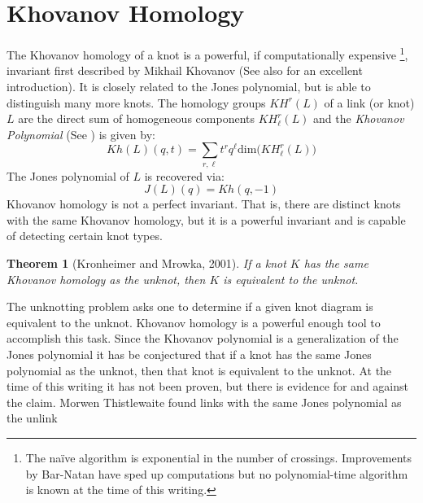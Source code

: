\documentclass{article}
\theoremstyle{plain}
\newtheorem{theorem}{Theorem}
\begin{document}
    \section{Khovanov Homology}
        The Khovanov homology of a knot is a powerful, if computationally
        expensive%
        \footnote{%
            The na\"{i}ve algorithm is exponential in the number of
            crossings. Improvements by Bar-Natan \cite{BarNatanFastKhoHo}
            have sped up computations but no polynomial-time algorithm is
            known at the time of this writing.
        },
        invariant first described by Mikhail Khovanov
        \cite{Khovanov1999CatJonesPoly} (See also \cite{barnatan2002khovanov}
        for an excellent introduction). It is closely related to the Jones
        polynomial, but is able to distinguish many more knots. The homology
        groups $KH^{r}(L)$ of a link (or knot) $L$ are the direct sum of
        homogeneous components $KH_{\ell}^{r}(L)$ and the
        \textit{Khovanov Polynomial} (See \cite{KatlasKhoHo}) is given by:
        \begin{equation}
            Kh(L)(q,t)=
            \sum_{r,\ell}t^{r}q^{\ell}\textrm{dim}\big(KH_{\ell}^{r}(L)\big)
        \end{equation}
        The Jones polynomial of $L$ is recovered via:
        \begin{equation}
            J(L)(q)=Kh(q,-1)
        \end{equation}
        Khovanov homology is not a perfect invariant. That is, there are
        distinct knots with the same Khovanov homology, but it is a powerful
        invariant and is capable of detecting certain knot types.
        \begin{theorem}[Kronheimer and Mrowka, 2001]
            If a knot $K$ has the same Khovanov homology as the unknot, then $K$
            is equivalent to the unknot.
        \end{theorem}
        The unknotting problem asks one to determine if a given knot diagram is
        equivalent to the unknot. Khovanov homology is a powerful enough tool
        to accomplish this task. Since the Khovanov polynomial is a
        generalization of the Jones polynomial it has be conjectured that if a
        knot has the same Jones polynomial as the unknot, then that knot is
        equivalent to the unknot. At the time of this writing it has not been
        proven, but there is evidence for and against the claim. Morwen
        Thistlewaite found links with the same Jones polynomial as the unlink
\end{document}
